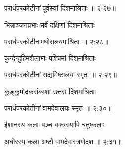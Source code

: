 
{\devanagarifont परार्धपरकोटीनां पूर्वस्यां दिशमाश्रिताः {॥ २:२७॥} \veg\dontdisplaylinenum }%

{\devanagarifont भिन्नाञ्जनप्रभाः सर्वे दक्षिणां दिशमाश्रिताः \thinspace{\dandab} \dontdisplaylinenum }%


{\devanagarifont परार्धपरकोटीनामघोरालयमाश्रिताः {॥ २:२८॥} \veg\dontdisplaylinenum }%

{\devanagarifont कुन्देन्दुहिमशैलाभाः पश्चिमां दिशमाश्रिताः \thinspace{\dandab} \dontdisplaylinenum }%


{\devanagarifont परार्धपरकोटीनां सद्यमिष्टालयः स्मृतः {॥ २:२९॥} \veg\dontdisplaylinenum }%

{\devanagarifont कुङ्कुमोदकसंकाशा उत्तरां दिशमाश्रिताः \thinspace{\dandab} \dontdisplaylinenum }%


{\devanagarifont परार्धपरकोतीनां वामदेवालयः स्मृतः {॥ २:३०॥} \veg\dontdisplaylinenum }%

{\devanagarifont ईशानस्य कलाः पञ्च वक्त्रस्यापि चतुष्कलाः \thinspace{\dandab} \dontdisplaylinenum }%


{\devanagarifont अघोरस्य कला अष्टौ वामदेवास्त्रयोदश {॥ २:३१॥} \veg\dontdisplaylinenum }%

